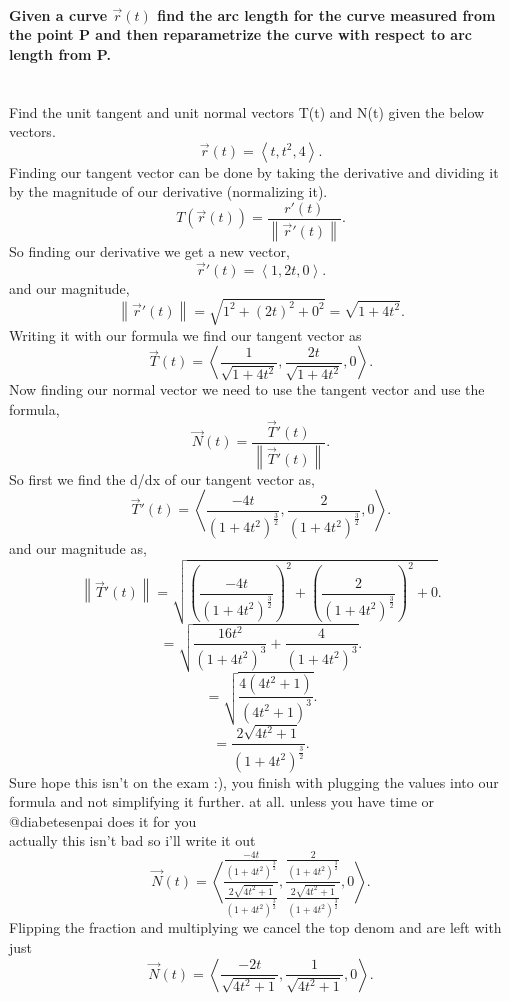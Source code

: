\documentclass{report}
\begin{document}
\begin{multicols}{2}
\paragraph{Given a curve $ \vec{ r }\left( t \right)  $ find the arc length for the curve measured from the point P and then reparametrize the curve with respect to arc length from P.\\ \\}
Find the unit tangent and unit normal vectors T(t) and N(t) given the below vectors.
\[
\vec{ r }\left( t \right) = \left< t, t^2,4 \right>
.\] 
Finding our tangent vector can be done by taking the derivative and dividing it by the magnitude of our derivative (normalizing it).
\begin{equation}
T\left( \vec{ r }\left( t \right)  \right) = \frac{ r'\left( t \right)  }{ \left\| \vec{ r }'\left( t \right)  \right\| }
.\end{equation}
So finding our derivative we get a new vector,
\[
\vec{ r }'\left( t \right) = \left<1,2t,0 \right>
.\] 
and our magnitude,
\[
\left\| \vec{ r }'\left( t \right)  \right\| = \sqrt{ 1^2 + \left( 2t \right) ^2 + 0^2 } = \sqrt{ 1+4t^2 }
.\] 
Writing it with our formula we find our tangent vector as
\[
\vec{ T }\left( t \right) = \left< \frac{ 1 }{ \sqrt{ 1+4t^2 }  }, \frac{ 2t }{ \sqrt{ 1+4t^2 }  }, 0 \right>
.\] 
Now finding our normal vector we need to use the tangent vector and use the formula,
\begin{equation}
	\vec{ N }\left( t \right) = \frac{ \vec{ T }'\left( t \right)  }{ \left\| \vec{ T }'\left( t \right)  \right\| }
.\end{equation}
So first we find the d/dx of our tangent vector as,
\[
\vec{ T }'\left( t \right) = \left< \frac{ -4t }{ \left( 1+4t^2 \right) ^{ \frac{ 3 }{ 2 }  } }, \frac{ 2 }{ \left( 1+4t^2 \right) ^{ \frac{ 3 }{ 2 }  } }, 0 \right>
.\] 
and our magnitude as,
\[
\left\| \vec{ T }'\left( t \right)  \right\| = \sqrt{ \left( \frac{ -4t }{ \left( 1+4t^2 \right) ^{ \frac{ 3 }{ 2 }  } } \right) ^2 + \left( \frac{ 2 }{ \left( 1+4t^2 \right) ^{ \frac{ 3 }{ 2 }  } }  \right) ^2 + 0} 
.\] 
\[
= \sqrt{ \frac{ 16t^2 }{ \left( 1+4t^2 \right) ^3 } + \frac{ 4 }{ \left( 1+4t^2 \right)^{ 3 }  } } 
.\] 
\[
= \sqrt{ \frac{ 4\left( 4t^2+1 \right)  }{ \left( 4t^2+1 \right) ^3 } } 
.\] 
\[
= \frac{ 2\sqrt{ 4t^2+1 }  }{ \left( 1+4t^2 \right) ^{ \frac{ 3 }{ 2 }  } }
.\] 
Sure hope this isn't on the exam :), you finish with plugging the values into our formula and not simplifying it further. at all. unless you have time or @diabetesenpai does it for you \\
actually this isn't bad so i'll write it out
\[
\vec{ N }\left( t \right) = \left< \frac{ \frac{ -4t }{ \left( 1+4t^2 \right) ^{ \frac{ 3 }{ 2 }  } } }{ \frac{ 2\sqrt{ 4t^2+1 }  }{ \left( 1+4t^2 \right) ^{ \frac{ 3 }{ 2 }  } } } , \frac{ \frac{ 2 }{ \left( 1+4t^2 \right) ^{ \frac{ 3 }{ 2 }  } } }{ \frac{ 2\sqrt{ 4t^2+1 }  }{ \left( 1+4t^2 \right) ^{ \frac{ 3 }{ 2 }  } } }, 0\right>
.\] 
Flipping the fraction and multiplying we cancel the top denom and are left with just
\[
\vec{ N }\left( t \right) = \left< \frac{ -2t }{ \sqrt{ 4t^2+1 }  }, \frac{ 1 }{ \sqrt{ 4t^2+1 }  }, 0  \right>
.\] 

\end{multicols}
\end{document}
